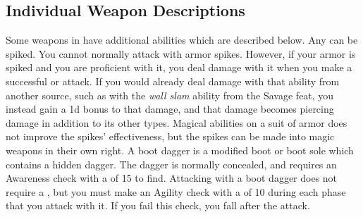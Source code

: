     \subsection{Individual Weapon Descriptions}
        Some weapons in  have additional abilities which are described below.
         Any  can be spiked.
        You cannot normally attack with armor spikes.
        However, if your armor is spiked and you are proficient with it, you deal damage with it when you make a successful  or  attack.
        If you would already deal damage with that ability from another source, such as with the \textit{wall slam} ability from the Savage feat, you instead gain a \plus1d bonus to that damage, and that damage becomes piercing damage in addition to its other types.
        Magical abilities on a suit of armor does not improve the spikes' effectiveness, but the spikes can be made into magic weapons in their own right.
         A boot dagger is a modified boot or boot sole which contains a hidden dagger.
        The dagger is normally concealed, and requires an Awareness check with a  of 15 to find.
        Attacking with a boot dagger does not require a , but you must make an Agility check with a  of 10 during each phase that you attack with it.
        If you fail this check, you fall  after the attack.

